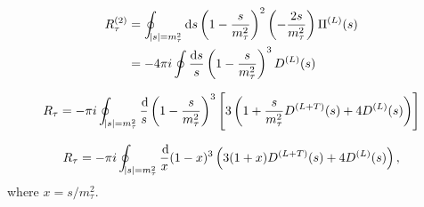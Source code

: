 \documentclass[../../index.tex]{subfiles}
\begin{document}
\begin{equation}
  \begin{split}
    R_\tau^{(2)} &= \oint_{\abs{s}=m_\tau^2} \dif s \left( 1 - \frac{s}{m_\tau^2} \right)^2 \left( - \frac{2 s}{m_\tau^2} \right) \Pi^{(L)}(s) \\
    &= - 4 \pi i \oint \frac{\dif s}{s} \left( 1 - \frac{s}{m_\tau^2} \right)^3 D^{(L)}(s)
  \end{split}
\end{equation}

\begin{equation}
  R_\tau = - \pi i \oint_{\abs{s}=m_\tau^2} \frac{\dif}{s} \left( 1 - \frac{s}{m_\tau^2} \right)^3 \left[ 3 \left( 1 + \frac{s}{m_\tau^2} D^{(L+T)}(s) + 4 D^{(L)}(s) \right) \right]
\end{equation}

\begin{equation}
  R_\tau = - \pi i \oint_{\abs{s}=m_\tau^2} \frac{\dif}{x} (1 - x)^3 \left( 3 (1 + x) D^{(L+T)}(s) + 4 D^{(L)}(s)  \right),
\end{equation}
where $x=s/m_\tau^2$.
\end{document}
